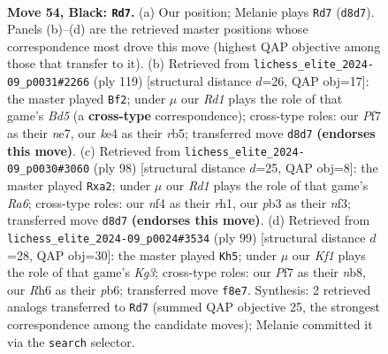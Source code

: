 \documentclass[11pt]{article}
\begin{document}
\clearpage

\begin{figure}[p]\centering
\begin{subfigure}{0.46\textwidth}\centering
\resizebox{\linewidth}{!}{%
\newchessgame
\chessboard[
  setfen={3r1k2/5p2/7r/p7/3pKN2/1P6/R6P/2R5 b - - 3 54},
  showmover=false,
  pgfstyle=straightmove, color=movearrow, markmove={d8-d7}
]}
\caption{}
\end{subfigure}\hfill
\begin{subfigure}{0.46\textwidth}\centering
\resizebox{\linewidth}{!}{%
\newchessgame
\chessboard[
  setfen={8/4N1k1/7p/pR6/3b1P1p/1P6/r7/7K b - - 2 60},
  showmover=false,
  pgfstyle=straightmove, color=movearrow, markmove={d4-f2}
]}
\caption{}
\end{subfigure}
\\[4pt]
\begin{subfigure}{0.46\textwidth}\centering
\resizebox{\linewidth}{!}{%
\newchessgame
\chessboard[
  setfen={8/7k/R6P/5p2/2P2P2/5nP1/p4K2/7r w - - 1 50},
  showmover=false,
  pgfstyle=straightmove, color=movearrow, markmove={a6-a2}
]}
\caption{}
\end{subfigure}\hfill
\begin{subfigure}{0.46\textwidth}\centering
\resizebox{\linewidth}{!}{%
\newchessgame
\chessboard[
  setfen={1N6/5p2/1P4k1/4P3/5Kp1/7p/7R/6r1 b - - 0 50},
  showmover=false,
  pgfstyle=straightmove, color=movearrow, markmove={g6-h5}
]}
\caption{}
\end{subfigure}
\caption{\textbf{Move 54, Black: \texttt{Rd7}.} (a) Our position; Melanie plays \texttt{Rd7} (\texttt{d8d7}). Panels (b)--(d) are the retrieved master positions whose correspondence most drove this move (highest QAP objective among those that transfer to it). (b) Retrieved from \texttt{lichess\_elite\_2024-09\_p0031\#2266} (ply 119) [structural distance $d$=26, QAP obj=17]: the master played \texttt{Bf2}; under $\mu$ our \emph{Rd1} plays the role of that game's \emph{Bd5} (a \textbf{cross-type} correspondence); cross-type roles: our \emph{P}f7 as their \emph{n}e7, our \emph{k}e4 as their \emph{r}b5; transferred move \texttt{d8d7} \textbf{(endorses this move)}. (c) Retrieved from \texttt{lichess\_elite\_2024-09\_p0030\#3060} (ply 98) [structural distance $d$=25, QAP obj=8]: the master played \texttt{Rxa2}; under $\mu$ our \emph{Rd1} plays the role of that game's \emph{Ra6}; cross-type roles: our \emph{n}f4 as their \emph{r}h1, our \emph{p}b3 as their \emph{n}f3; transferred move \texttt{d8d7} \textbf{(endorses this move)}. (d) Retrieved from \texttt{lichess\_elite\_2024-09\_p0024\#3534} (ply 99) [structural distance $d$=28, QAP obj=30]: the master played \texttt{Kh5}; under $\mu$ our \emph{Kf1} plays the role of that game's \emph{Kg3}; cross-type roles: our \emph{P}f7 as their \emph{n}b8, our \emph{R}h6 as their \emph{p}b6; transferred move \texttt{f8e7}. Synthesis: 2 retrieved analogs transferred to \texttt{Rd7} (summed QAP objective 25, the strongest correspondence among the candidate moves); Melanie committed it via the \texttt{search} selector.}
\label{fig:thought-m107}
\end{figure}
\end{document}
